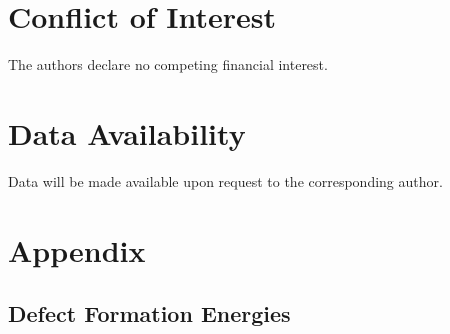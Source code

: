 \documentclass[review]{elsarticle}
\begin{document}
\section{Conflict of Interest}\label{sec6}
The authors declare no competing financial interest.

\section{Data Availability}\label{sec7}
Data will be made available upon request to the corresponding author. 

\section{Appendix}
\setcounter{figure}{0}
\setcounter{table}{0}
\renewcommand{\thefigure}{A\arabic{figure}}
\renewcommand{\thetable}{A\arabic{table}}

\subsection{Defect Formation Energies}
\end{document}
